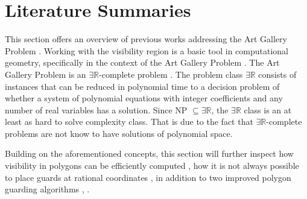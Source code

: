 \section{Literature Summaries}
\label{sec:literature}

This section offers an overview of previous works addressing the Art Gallery Problem \cite{o1987art}. 
Working with the visibility region is a basic tool in computational geometry, specifically in the context of the Art Gallery Problem \cite{o1987art}. The Art Gallery Problem \cite{o1987art} is an $\exists \mathbb R$-complete problem \cite{abrahamsen2021art}. The problem class $\exists \mathbb R$ consists of instances that can be reduced in polynomial time to a decision problem of whether a system of polynomial equations with integer coefficients and any number of real variables has a solution. Since NP $\subseteq \exists \mathbb R$, the $\exists \mathbb R$ class is an at least as hard to solve complexity class. That is due to the fact that $\exists \mathbb R$-complete problems are not know to have solutions of polynomial space. 

Building on the aforementioned concepts, this section will further inspect how visibility in polygons can be efficiently computed \cite{DBLP:journals/corr/BungiuHHHK14}, how it is not always possible to place guards at rational coordinates \cite{abrahamsen2021art}, in addition to two improved polygon guarding algorithms \cite{maleki2022implementation}, \cite{DBLP:journals/corr/abs-2007-06920}.





\newpage

